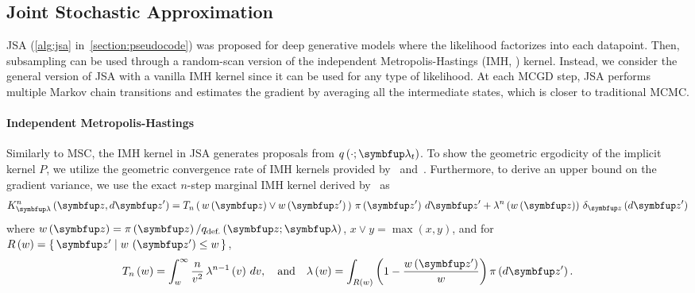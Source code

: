 \subsection{Joint Stochastic Approximation}
\vspace{-0.1in}
JSA (\cref{alg:jsa} in~\cref{section:pseudocode}) was proposed for deep generative models where the likelihood factorizes into each datapoint.
Then, subsampling can be used through a random-scan version of the independent Metropolis-Hastings (IMH, \citealt{hastings_monte_1970}) kernel.
Instead, we consider the general version of JSA with a vanilla IMH kernel since it can be used for any type of likelihood.
At each MCGD step, JSA performs multiple Markov chain transitions and estimates the gradient by averaging all the intermediate states, which is closer to traditional MCMC.

\vspace{-0.1in}
\paragraph{Independent Metropolis-Hastings}
Similarly to MSC, the IMH kernel in JSA generates proposals from \(q\left(\cdot; \vlambda_t\right)\).
To show the geometric ergodicity of the implicit kernel \(P\), we utilize the geometric convergence rate of IMH kernels provided by~\citet[Theorem 2.1]{10.2307/2242610} and~\citet{wang_exact_2020}.
Furthermore, to derive an upper bound on the gradient variance, we use the exact \(n\)-step marginal IMH kernel derived by~\citet{Smith96exacttransition} as
{%
  \begin{align}
  K^n_{\vlambda}\left(\vz, d\vz^{\prime}\right) 
  = T_n\left(\, w\left(\vz\right) \vee w\left(\vz^{\prime}\right)\,\right) \, \pi\left(\vz^{\prime}\right) \, d\vz^{\prime}
  + \lambda^n\left(w\left(\vz\right)\right) \, \delta_{\vz}\left(d\vz^{\prime}\right)
  \label{eq:imh_exact_kernel}
  \end{align}
}%
where {\(w\left(\vz\right) = \pi\left(\vz\right)/q_{\text{def.}}\left(\vz; \vlambda\right)\), \(x \vee y = \max\left(x, y\right)\)}, and for {\(R\left(w\right) = \{\, \vz^{\prime} \mid w\,\left(\vz^{\prime}\right) \leq w \,\}\)}, 
{%
  \begin{align}
    T_n\left(w\right)      = \int_w^{\infty}
    \frac{n}{v^2}
    \, \lambda^{n-1}\left(v\right)\,dv,
    \quad\text{and}\quad
    \lambda\left(w\right) =
    \int_{R\left(w\right)}
    \left( 1 - \frac{w\left(\vz^{\prime}\right)}{w}  \right)
    \pi\left(d\vz^{\prime}\right).\label{eq:T_lambda}
  \end{align}
}%

\vspace{-0.05in}

%
\vspace{-0.1in}
